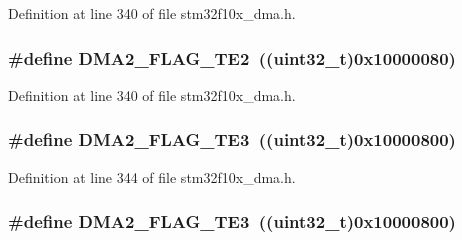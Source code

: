 Definition at line 340 of file stm32f10x\+\_\+dma.\+h.

\subsubsection[{\texorpdfstring{D\+M\+A2\+\_\+\+F\+L\+A\+G\+\_\+\+T\+E2}{DMA2_FLAG_TE2}}]{\setlength{\rightskip}{0pt plus 5cm}\#define D\+M\+A2\+\_\+\+F\+L\+A\+G\+\_\+\+T\+E2~(({\bf uint32\+\_\+t})0x10000080)}\hypertarget{group___d_m_a__flags__definition_ga3d396b14851e789ad549126da55b7f3f}{}\label{group___d_m_a__flags__definition_ga3d396b14851e789ad549126da55b7f3f}


Definition at line 340 of file stm32f10x\+\_\+dma.\+h.

\subsubsection[{\texorpdfstring{D\+M\+A2\+\_\+\+F\+L\+A\+G\+\_\+\+T\+E3}{DMA2_FLAG_TE3}}]{\setlength{\rightskip}{0pt plus 5cm}\#define D\+M\+A2\+\_\+\+F\+L\+A\+G\+\_\+\+T\+E3~(({\bf uint32\+\_\+t})0x10000800)}\hypertarget{group___d_m_a__flags__definition_gacdf472c665395a07681a7d499ac0f0bb}{}\label{group___d_m_a__flags__definition_gacdf472c665395a07681a7d499ac0f0bb}


Definition at line 344 of file stm32f10x\+\_\+dma.\+h.

\subsubsection[{\texorpdfstring{D\+M\+A2\+\_\+\+F\+L\+A\+G\+\_\+\+T\+E3}{DMA2_FLAG_TE3}}]{\setlength{\rightskip}{0pt plus 5cm}\#define D\+M\+A2\+\_\+\+F\+L\+A\+G\+\_\+\+T\+E3~(({\bf uint32\+\_\+t})0x10000800)}\hypertarget{group___d_m_a__flags__definition_gacdf472c665395a07681a7d499ac0f0bb}{}\label{group___d_m_a__flags__definition_gacdf472c665395a07681a7d499ac0f0bb}


